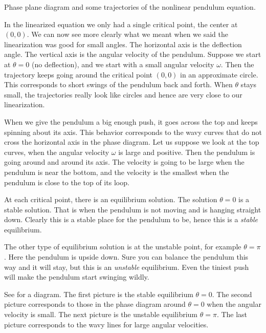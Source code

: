 \begin{myfig}
\capstart
{}
\caption{Phase plane diagram and some trajectories of
the nonlinear pendulum equation. \label{fig:nlin-pend-phasediag}}
\end{myfig}

In the linearized equation we only had a single critical point, the center
at $(0,0)$.  We can now see more clearly what we meant when we said the
linearization was good for small angles.  The horizontal axis is the
deflection angle.  The vertical axis is the angular velocity of the
pendulum.  Suppose we start at $\theta = 0$ (no deflection), and
we start with a small angular velocity $\omega$.  Then the trajectory keeps going
around the critical point $(0,0)$ in an approximate circle.  This
corresponds to short swings of the pendulum back and forth.  When $\theta$
stays small, the trajectories really look like circles and hence are very
close to our linearization.

When we give the pendulum a big enough push, it
goes across the top and keeps spinning about its axis.  This behavior
corresponds to the
wavy curves that do not cross the horizontal axis in the phase diagram.
Let us suppose we look at the top curves, when the angular velocity $\omega$
is large and positive.  Then the pendulum is going
around and around its axis.  The velocity is going to
be large when the pendulum is near the bottom, and the velocity is the
smallest when the pendulum
is close to the top of its loop.

At each critical point, there is an equilibrium solution.  The solution
$\theta = 0$ is a stable solution.  That is when the pendulum is not moving
and is hanging straight down.  Clearly this is a stable place for the
pendulum to be, hence this is a \emph{stable} equilibrium.

The other type of equilibrium solution is at the unstable point, for example
$\theta = \pi$.  Here the pendulum is upside down.  Sure you can balance the
pendulum this way and it will stay, but this is an \emph{unstable} equilibrium.
Even the tiniest push will make the pendulum start swinging wildly.

See  for a diagram.  The first picture is the
stable equilibrium $\theta = 0$.  The second picture corresponds to those
 in the phase diagram around $\theta =0$ when the angular
velocity is small.  The next picture is the unstable equilibrium $\theta =
\pi$.  The last picture corresponds to the wavy lines for large angular
velocities.

